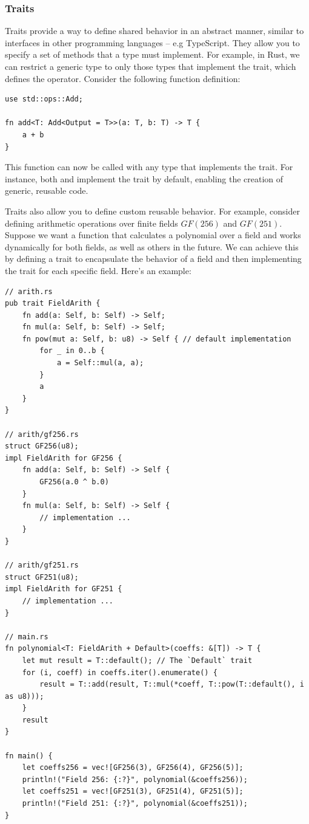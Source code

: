 \documentclass[twoside,11pt]{report}
\theoremstyle{definition}
\theoremstyle{plain}
\begin{document}
\subsubsection*{Traits}
Traits provide a way to define shared behavior in an abstract manner, similar to interfaces in other programming languages -- e.g TypeScript. They allow you to specify a set of methods that a type must implement. For example, in Rust, we can restrict a generic type  to only those types that implement the  trait, which defines the \rust{+} operator. Consider the following function definition:

\begin{verbatim}
use std::ops::Add;

fn add<T: Add<Output = T>>(a: T, b: T) -> T {
    a + b
}
\end{verbatim}

This function can now be called with any type that implements the  trait. For instance, both  and  implement the  trait by default, enabling the creation of generic, reusable code.

Traits also allow you to define custom reusable behavior. For example, consider defining arithmetic operations over finite fields $GF(256)$ and $GF(251)$. Suppose we want a function that calculates a polynomial over a field and works dynamically for both fields, as well as others in the future. We can achieve this by defining a trait to encapsulate the behavior of a field and then implementing the trait for each specific field. Here's an example:

\begin{verbatim}
// arith.rs
pub trait FieldArith {
    fn add(a: Self, b: Self) -> Self;
    fn mul(a: Self, b: Self) -> Self;
    fn pow(mut a: Self, b: u8) -> Self { // default implementation
        for _ in 0..b {
            a = Self::mul(a, a);
        }
        a
    }
}

// arith/gf256.rs
struct GF256(u8);
impl FieldArith for GF256 {
    fn add(a: Self, b: Self) -> Self {
        GF256(a.0 ^ b.0)
    }
    fn mul(a: Self, b: Self) -> Self {
        // implementation ...
    }
}

// arith/gf251.rs
struct GF251(u8);
impl FieldArith for GF251 {
    // implementation ...
}

// main.rs
fn polynomial<T: FieldArith + Default>(coeffs: &[T]) -> T {
    let mut result = T::default(); // The `Default` trait
    for (i, coeff) in coeffs.iter().enumerate() {
        result = T::add(result, T::mul(*coeff, T::pow(T::default(), i as u8)));
    }
    result
}

fn main() {
    let coeffs256 = vec![GF256(3), GF256(4), GF256(5)];
    println!("Field 256: {:?}", polynomial(&coeffs256));
    let coeffs251 = vec![GF251(3), GF251(4), GF251(5)];
    println!("Field 251: {:?}", polynomial(&coeffs251));
}
\end{verbatim}
\end{document}
